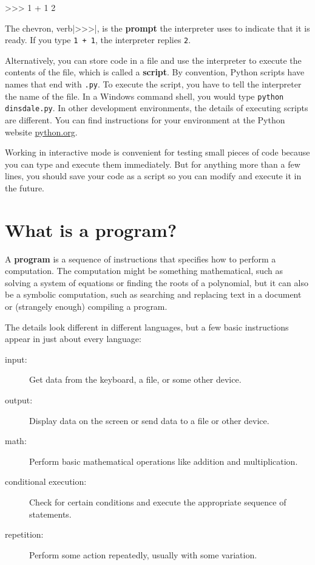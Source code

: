 
\beforeverb
\begin{pyinterpreter}
>>> 1 + 1
2
\end{pyinterpreter}
\afterverb
%
The chevron, verb|>>>|, is the
{\bf prompt} the interpreter uses to indicate that it is ready.  If
you type {\tt 1 + 1}, the interpreter replies {\tt 2}.


Alternatively, you can store code in a file and use the interpreter to
execute the contents of the file, which is called a {\bf script}.  By
convention, Python scripts have names that end with {\tt .py}.
To execute the script, you have to tell the interpreter the name of
the file. In a Windows command shell, you would type {\tt python
	dinsdale.py}.  In other development environments, the details of
executing scripts are different.  You can find instructions for
your environment at the Python website \url{python.org}.


Working in interactive mode is convenient for testing small pieces of
code because you can type and execute them immediately.  But for
anything more than a few lines, you should save your code
as a script so you can modify and execute it in the future.


\section{What is a program?}

A {\bf program} is a sequence of instructions that specifies how to
perform a computation.  The computation might be something
mathematical, such as solving a system of equations or finding the
roots of a polynomial, but it can also be a symbolic computation, such
as searching and replacing text in a document or (strangely enough)
compiling a program.


The details look different in different languages, but a few basic
instructions appear in just about every language:

\begin{description}
	
	\item[input:] Get data from the keyboard, a file, or some
	other device.
	
	\item[output:] Display data on the screen or send data to a
	file or other device.
	
	\item[math:] Perform basic mathematical operations like addition and
	multiplication.
	
	\item[conditional execution:] Check for certain conditions and
	execute the appropriate sequence of statements.
	
	\item[repetition:] Perform some action repeatedly, usually with
	some variation.
	
\end{description}

